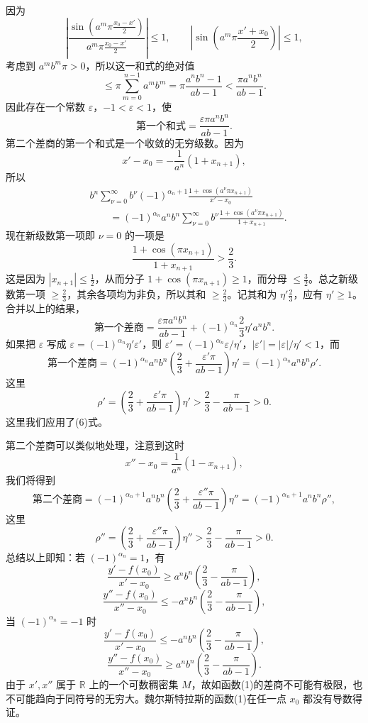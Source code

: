 因为
\[
 \left|\frac{\sin\!\left(a^m\pi\frac{x_0-x'}2\right)}
 {a^m\pi\frac{x_0-x'}2}\right|\le1,
 \qquad
 \left|\sin\!\left(a^m\pi\frac{x'+x_0}{2}\right)\right|\le1,
\]
考虑到 $a^m b^m\pi>0$，所以这一和式的绝对值
\[
 \le \pi\sum_{m=0}^{n-1}a^m b^m
 =\pi\frac{a^n b^n-1}{ab-1}
 <\frac{\pi a^n b^n}{ab-1}.
\]
因此存在一个常数 $\varepsilon$，$-1<\varepsilon<1$，使
\begin{equation}
 \text{第一个和式}=\frac{\varepsilon\pi a^n b^n}{ab-1}.
 \tag{7}
\end{equation}
第二个差商的第一个和式是一个收敛的无穷级数。因为
\[
 x'-x_0=-\frac1{a^n}(1+x_{n+1}),
\]
所以
\begin{align*}
 &b^n\sum_{\nu=0}^{\infty}b^\nu(-1)^{\alpha_n+1}
 \frac{1+\cos(a^\nu\pi x_{n+1})}{x'-x_0}\\
 &\qquad=(-1)^{\alpha_n}a^n b^n
 \sum_{\nu=0}^{\infty}b^\nu
 \frac{1+\cos(a^\nu\pi x_{n+1})}{1+x_{n+1}}.
\end{align*}
现在新级数第一项即 $\nu=0$ 的一项是
\[
 \frac{1+\cos(\pi x_{n+1})}{1+x_{n+1}}>\frac23.
\]
这是因为 $|x_{n+1}|\le\frac12$，从而分子 $1+\cos(\pi x_{n+1})\ge1$，而分母 $\le\frac32$。总之新级数第一项 $\ge\frac23$，其余各项均为非负，所以其和 $\ge\frac23$。记其和为 $\eta'\frac23$，应有 $\eta'\ge1$。合并以上的结果，
\[
 \text{第一个差商}=\frac{\varepsilon\pi a^n b^n}{ab-1}
 +(-1)^{\alpha_n}\frac23\eta' a^n b^n.
\]
如果把 $\varepsilon$ 写成 $\varepsilon=(-1)^{\alpha_n}\eta'\varepsilon'$，则 $\varepsilon'=(-1)^{\alpha_n}\varepsilon/\eta'$，$|\varepsilon'|=|\varepsilon|/\eta'<1$，而
\begin{equation}
 \text{第一个差商}=(-1)^{\alpha_n}a^n b^n
 \left(\frac23+\frac{\varepsilon'\pi}{ab-1}\right)\eta'
 =(-1)^{\alpha_n}a^n b^n\rho'.
 \tag{8}
\end{equation}
这里
\[
 \rho'=\left(\frac23+\frac{\varepsilon'\pi}{ab-1}\right)\eta'
 >\frac23-\frac{\pi}{ab-1}>0.
\]
这里我们应用了(6)式。

第二个差商可以类似地处理，注意到这时
\[
 x''-x_0=\frac1{a^n}(1-x_{n+1}),
\]
我们将得到
\begin{equation}
 \text{第二个差商}=(-1)^{\alpha_n+1}a^n b^n
 \left(\frac23+\frac{\varepsilon''\pi}{ab-1}\right)\eta''
 =(-1)^{\alpha_n+1}a^n b^n\rho'',
 \tag{9}
\end{equation}
这里
\[
 \rho''=\left(\frac23+\frac{\varepsilon''\pi}{ab-1}\right)\eta''
 >\frac23-\frac{\pi}{ab-1}>0.
\]
总结以上即知：若 $(-1)^{\alpha_n}=1$，有
\[
 \frac{y'-f(x_0)}{x'-x_0}\ge a^n b^n\left(\frac23-\frac{\pi}{ab-1}\right),
\]
\[
 \frac{y''-f(x_0)}{x''-x_0}\le -a^n b^n\left(\frac23-\frac{\pi}{ab-1}\right),
\]
当 $(-1)^{\alpha_n}=-1$ 时
\[
 \frac{y'-f(x_0)}{x'-x_0}\le -a^n b^n\left(\frac23-\frac{\pi}{ab-1}\right),
\]
\[
 \frac{y''-f(x_0)}{x''-x_0}\ge a^n b^n\left(\frac23-\frac{\pi}{ab-1}\right).
\]
由于 $x',x''$ 属于 $\mathbb R$ 上的一个可数稠密集 $M$，故如函数(1)的差商不可能有极限，也不可能趋向于同符号的无穷大。魏尔斯特拉斯的函数(1)在任一点 $x_0$ 都没有导数得证。
